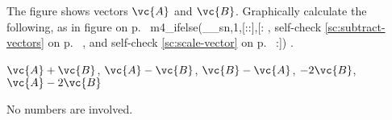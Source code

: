 The figure shows vectors $\vc{A}$ and $\vc{B}$. 
Graphically calculate the following, as in 
figure  on p.~\pageref{fig:tip-to-tail}%
m4_ifelse(__sn,1,[::],[:%
, self-check
\ref{sc:subtract-vectors} on p.~\pageref{sc:subtract-vectors}%
, and self-check \ref{sc:scale-vector} on p.~\pageref{sc:scale-vector}%
:])%
.

         $\vc{A}+\vc{B}$,  $\vc{A}-\vc{B}$,  $\vc{B}-\vc{A}$,  $-2\vc{B}$,  $\vc{A}-2\vc{B}$

\noindent No numbers are involved.
